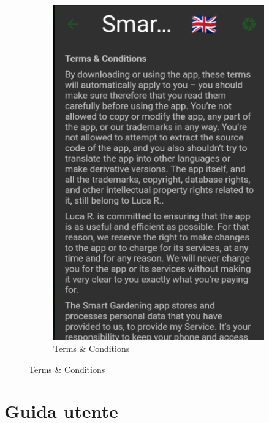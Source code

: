 \documentclass[a4paper,12pt]{report}
\begin{document}
\begin{figure}[H]
\begin{subfigure}{0.3\textwidth}
		\includegraphics[width=\textwidth]{./images/terms_and_conditions/terms_and_conditions_screen.png}
		\caption{Terms \& Conditions}
		\label{fig:terms_and_conditions}
	\end{subfigure}
\end{figure}
	
	
\newpage %

\section{Guida utente}
\end{document}
